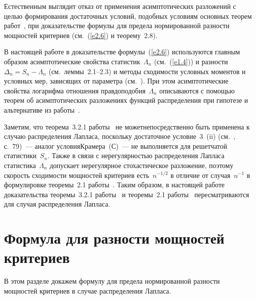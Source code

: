 \begin{multicols}{2}
Естественным выглядит отказ от применения асимптотических разложений с целью 
формирования достаточных условий, подобных условиям основных теорем работ~\cite{1ben, 2ben}, 
при доказательстве формулы для предела нормированной разности мощностей критериев (см.~(\ref{e2.6}) и теорему~2.8).

В настоящей работе в доказательстве формулы~(\ref{e2.6}) используются главным образом асимптотические 
свойства статистик~$\Lambda_n$ (см.~(\ref{e1.4})) и раз\-ности
$\Delta_n=S_n-\Lambda_n$
(см.\ леммы~2.1--2.3) и методы сходи\-мости условных моментов и условных мер, за\-висящих от параметра 
(см.~\cite{1ben, 2ben}). При этом асимптотические свойства логарифма отношения правдоподобия~$\Lambda_n$ 
описываются с помощью теорем об асимптотических разложениях функций распределения при гипотезе и альтернативе 
из работы~\cite{6ben}.

Заметим, что теорема~3.2.1 работы~\cite{1ben} не может\linebreak непосредственно быть применена к случаю 
распределения Лапласа, поскольку достаточное условие~3~(ii) (см.~\cite{1ben}, с.~79)~--- 
аналог условия\linebreak Крамера~(С)~--- не выполняется для решетчатой статистики~$S_n$. Также в связи с 
нерегулярностью распре\-деления Лапласа статистика~$\Lambda_n$ допускает нерегулярное стохастическое 
разложение, поэтому скорость сходимости мощностей критериев есть~$n^{-1/2}$ в отличие от случая~$n^{-1}$ 
в формулировке теоремы~2.1 работы~\cite{2ben}. Таким образом, в настоящей работе доказательства теоремы~3.2.1 
работы~\cite{1ben} и теоремы~2.1 работы~\cite{2ben} пересматриваются для случая распределения Лапласа.

\section{Формула для разности мощностей критериев}

В этом разделе докажем формулу для предела нормированной разности мощностей критериев в случае распределения Лапласа.


\end{multicols}
